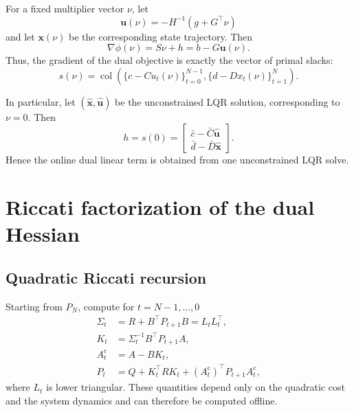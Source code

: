 \documentclass[11pt]{article}
\newcommand{\col}{\operatorname{col}}
\begin{document}
For a fixed multiplier vector \(\nu\), let
\begin{equation}
\bm{u}(\nu)
=
-H^{-1}(g+G^\top\nu)
\label{eq:dual-primal-map}
\end{equation}
and let \(\bm{x}(\nu)\) be the corresponding state trajectory.
Then
\begin{equation}
\nabla\phi(\nu)
=
S\nu+h
=
b-G\bm{u}(\nu).
\label{eq:gradient-slacks}
\end{equation}
Thus, the gradient of the dual objective is exactly the vector of
primal slacks:
\begin{equation}
s(\nu)
=
\col\left(
\{c-Cu_t(\nu)\}_{t=0}^{N-1},
\{d-Dx_t(\nu)\}_{t=1}^{N}
\right).
\label{eq:slack-definition}
\end{equation}

In particular, let
\((\widehat{\bm{x}},\widehat{\bm{u}})\) be the unconstrained LQR
solution, corresponding to \(\nu=0\). Then
\begin{equation}
h=s(0)=
\begin{bmatrix}
\bar c-\bar C\widehat{\bm{u}}\\
\bar d-\bar D\widehat{\bm{x}}
\end{bmatrix}.
\label{eq:dual-linear-slack}
\end{equation}
Hence the online dual linear term is obtained from one unconstrained
LQR solve.

\section{Riccati factorization of the dual Hessian}

\subsection{Quadratic Riccati recursion}

Starting from \(P_N\), compute for \(t=N-1,\ldots,0\)
\begin{equation}
\begin{aligned}
\Sigma_t&=R+B^\top P_{t+1}B=L_tL_t^\top,\\
K_t&=\Sigma_t^{-1}B^\top P_{t+1}A,\\
A_t^{\mathrm c}&=A-BK_t,\\
P_t&=Q+K_t^\top RK_t
 +(A_t^{\mathrm c})^\top P_{t+1}A_t^{\mathrm c},
\end{aligned}
\label{eq:riccati}
\end{equation}
where \(L_t\) is lower triangular. These quantities depend only on
the quadratic cost and the system dynamics and can therefore be
computed offline.
\end{document}
